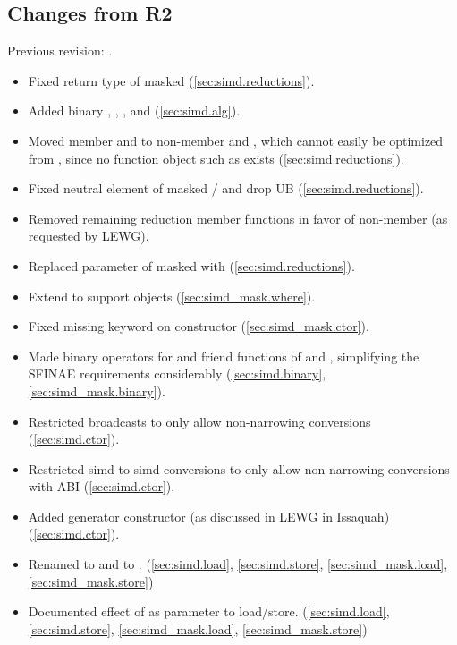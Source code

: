 \subsection{Changes from R2}
Previous revision: \parencite{P0214R2}.
\begin{itemize}
    \item Fixed return type of masked  (\ref{sec:simd.reductions}).
    \item Added binary , , , and  (\ref{sec:simd.alg}).
    \item Moved member  and  to non-member  and , which cannot easily be optimized from , since no function object such as  exists (\ref{sec:simd.reductions}).
    \item Fixed neutral element of masked / and drop UB (\ref{sec:simd.reductions}).
    \item Removed remaining reduction member functions in favor of non-member  (as requested by LEWG).
    \item Replaced  parameter of masked  with  (\ref{sec:simd.reductions}).
    \item Extend  to support \const \simd objects (\ref{sec:simd_mask.where}).
    \item Fixed missing  keyword on  constructor (\ref{sec:simd_mask.ctor}).
    \item Made binary operators for \simd and \mask friend functions of \simd and \mask, simplifying the SFINAE requirements considerably (\ref{sec:simd.binary}, \ref{sec:simd_mask.binary}).
    \item Restricted broadcasts to only allow non-narrowing conversions (\ref{sec:simd.ctor}).
    \item Restricted simd to simd conversions to only allow non-narrowing conversions with  ABI (\ref{sec:simd.ctor}).
    \item Added generator constructor (as discussed in LEWG in Issaquah) (\ref{sec:simd.ctor}).
    \item Renamed  to  and  to . (\ref{sec:simd.load}, \ref{sec:simd.store}, \ref{sec:simd_mask.load}, \ref{sec:simd_mask.store})
    \item Documented effect of  as  parameter to load/store. (\ref{sec:simd.load}, \ref{sec:simd.store}, \ref{sec:simd_mask.load}, \ref{sec:simd_mask.store})

\end{itemize}
